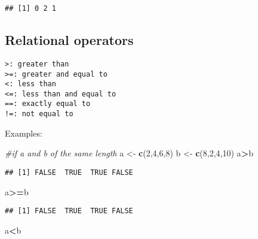 \documentclass[]{book}
\newenvironment{Shaded}{\begin{snugshade}}{\end{snugshade}}
\newcommand{\KeywordTok}[1]{\textcolor[rgb]{0.13,0.29,0.53}{\textbf{#1}}}
\newcommand{\DecValTok}[1]{\textcolor[rgb]{0.00,0.00,0.81}{#1}}
\newcommand{\StringTok}[1]{\textcolor[rgb]{0.31,0.60,0.02}{#1}}
\newcommand{\CommentTok}[1]{\textcolor[rgb]{0.56,0.35,0.01}{\textit{#1}}}
\newcommand{\OperatorTok}[1]{\textcolor[rgb]{0.81,0.36,0.00}{\textbf{#1}}}
\newcommand{\NormalTok}[1]{#1}
\theoremstyle{definition}
\theoremstyle{definition}
\theoremstyle{definition}
\theoremstyle{remark}
\begin{document}
\begin{Shaded}
\end{Shaded}

\begin{verbatim}
## [1] 0 2 1
\end{verbatim}

\subsection{Relational operators}\label{relational-operators}

\begin{verbatim}
>: greater than
>=: greater and equal to
<: less than
<=: less than and equal to
==: exactly equal to
!=: not equal to
\end{verbatim}

Examples:

\begin{Shaded}
\begin{Highlighting}[]
\CommentTok{#if a and b of the same length}
\NormalTok{a <-}\StringTok{ }\KeywordTok{c}\NormalTok{(}\DecValTok{2}\NormalTok{,}\DecValTok{4}\NormalTok{,}\DecValTok{6}\NormalTok{,}\DecValTok{8}\NormalTok{)}
\NormalTok{b <-}\StringTok{ }\KeywordTok{c}\NormalTok{(}\DecValTok{8}\NormalTok{,}\DecValTok{2}\NormalTok{,}\DecValTok{4}\NormalTok{,}\DecValTok{10}\NormalTok{)}
\NormalTok{a}\OperatorTok{>}\NormalTok{b}
\end{Highlighting}
\end{Shaded}

\begin{verbatim}
## [1] FALSE  TRUE  TRUE FALSE
\end{verbatim}

\begin{Shaded}
\begin{Highlighting}[]
\NormalTok{a}\OperatorTok{>=}\NormalTok{b}
\end{Highlighting}
\end{Shaded}

\begin{verbatim}
## [1] FALSE  TRUE  TRUE FALSE
\end{verbatim}

\begin{Shaded}
\begin{Highlighting}[]
\NormalTok{a}\OperatorTok{<}\NormalTok{b}
\end{Highlighting}
\end{Shaded}
\end{document}
